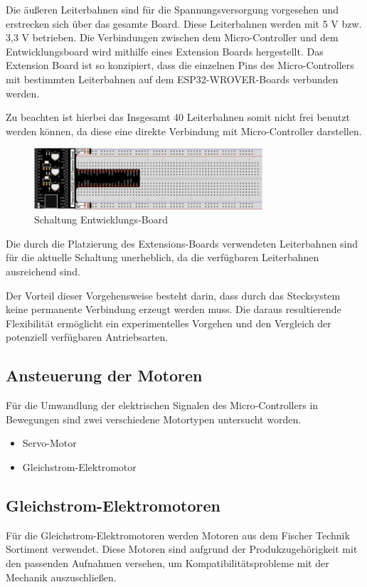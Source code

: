 \documentclass[conference,compsoc,final,a4paper]{IEEEtran}
\begin{document}
\noindent Die äußeren Leiterbahnen sind für die Spannungsversorgung vorgesehen und erstrecken sich über das gesamte Board. Diese Leiterbahnen werden mit 5 V bzw. 3,3 V betrieben.
Die Verbindungen zwischen dem Micro-Controller und dem Entwicklungsboard wird mithilfe eines Extension Boards hergestellt. Das Extension Board ist so konzipiert, 
dass die einzelnen Pins des Micro-Controllers mit bestimmten Leiterbahnen auf dem ESP32-WROVER-Boards verbunden werden.

\noindent Zu beachten ist hierbei das Insgesamt 40 Leiterbahnen somit nicht frei benutzt werden können, da diese eine direkte Verbindung mit Micro-Controller darstellen.
\begin{figure}[h]
\centering
\includegraphics[width=8.5cm]{../images/ext_board.png}
\caption{Schaltung Entwicklungs-Board\autocite{freenoveTutorial}}
\label{Elektrik:DevBoardext}
\end{figure}

\noindent Die durch die Platzierung des Extensions-Boards verwendeten Leiterbahnen sind für die aktuelle Schaltung unerheblich, da die verfügbaren Leiterbahnen ausreichend sind.

\noindent Der Vorteil dieser Vorgehensweise besteht darin, dass durch das Stecksystem keine permanente Verbindung erzeugt werden muss. 
Die daraus resultierende Flexibilität ermöglicht ein experimentelles Vorgehen und den Vergleich der potenziell verfügbaren Antriebsarten.

\subsection{Ansteuerung der Motoren}
Für die Umwandlung der elektrischen Signalen des Micro-Controllers in Bewegungen sind zwei verschiedene Motortypen untersucht worden.

\begin{itemize}
	\item Servo-Motor
	\item Gleichstrom-Elektromotor
\end{itemize}

\subsection{Gleichstrom-Elektromotoren}
\noindent Für die Gleichstrom-Elektromotoren werden Motoren aus dem Fischer Technik Sortiment verwendet. 
Diese Motoren sind aufgrund der Produkzugehörigkeit mit den passenden Aufnahmen versehen, um Kompatibilitätsprobleme mit der Mechanik auszuschließen.
\\
\end{document}
